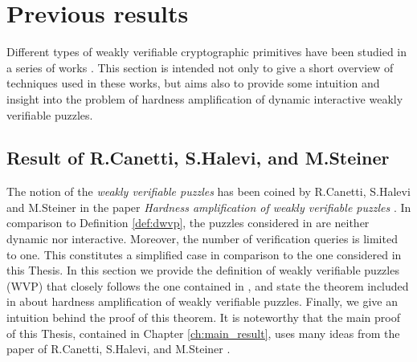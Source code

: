 \section{Previous results}
\label{st:previous_results}
Different types of weakly verifiable cryptographic primitives have been studied in a series of works
\cite{canetti2004hardness, Dodis:2009:SAI:1530441.1530450, DBLP:journals/corr/abs-1002-3534}.
This section is intended not only to give a short overview of techniques used in these works,
but aims also to provide some intuition and insight into the problem of hardness amplification
of dynamic interactive weakly verifiable puzzles.
\subsection{Result of R.Canetti, S.Halevi, and M.Steiner}
\label{subsec:chs}
The notion of the \textit{weakly verifiable puzzles} has been coined by R.Canetti, S.Halevi and M.Steiner in the paper
\textit{Hardness amplification of weakly verifiable puzzles} \cite{canetti2004hardness}.
In comparison to Definition \ref{def:dwvp}, the puzzles considered in \cite{canetti2004hardness} are neither dynamic nor interactive.
Moreover, the number of verification queries is limited to one.
This constitutes a simplified case in comparison to the one considered in this Thesis.
In this section we provide the definition of weakly verifiable puzzles (WVP) that closely follows the one contained in \cite{canetti2004hardness},
and state the theorem included in \cite{canetti2004hardness} about hardness amplification of weakly verifiable puzzles.
Finally, we give an intuition behind the proof of this theorem.
It is noteworthy that the main proof of this Thesis, contained in Chapter \ref{ch:main_result},
uses many ideas from the paper of R.Canetti, S.Halevi, and M.Steiner \cite{canetti2004hardness}.
%
